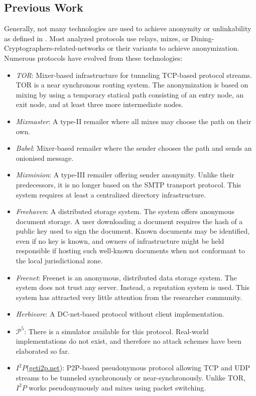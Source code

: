 \documentclass[runningheads]{llncs}
\begin{document}
\subsection{Previous Work}
Generally, not many technologies are used to achieve anonymity or unlinkability as defined in \cite{anon_terminology}. Most analyzed protocols use relays\cite{CHAUM1}, mixes\cite{CHAUM1}, or Dining-Cryptographers-related-networks\cite{chaum-dc} or their variants to achieve anonymization. Numerous protocols have evolved from these technologies:
\begin{itemize}
	\item \emph{TOR}\cite{tor-design}: Mixer-based infrastructure for tunneling TCP-based protocol streams. TOR is a near synchronous routing system. The anonymization is based on mixing by using a temporary statical path consisting of an entry node, an exit node, and at least three more intermediate nodes.
	\item \emph{Mixmaster}\cite{mixmaster-spec}: A type-II remailer where all mixes may choose the path on their own.
	\item \emph{Babel}\cite{babel}: Mixer-based remailer where the sender chooses the path and sends an onionised message.
	\item \emph{Mixminion}\cite{minion-design}: A type-III remailer offering sender anonymity. Unlike their predecessors, it is no longer based on the SMTP transport protocol. This system requires at least a centralized directory infrastructure.
	\item \emph{Freehaven}\cite{freehaven-berk}: A distributed storage system. The system offers anonymous document storage. A user downloading a document requires the hash of a public key used to sign the document. Known documents may be identified, even if no key is known, and owners of infrastructure might be held responsible if hosting such well-known documents when not conformant to the local jurisdictional zone.
	\item \emph{Freenet}\cite{freenet}: Freenet is an anonymous, distributed data storage system. The system does not trust any server. Instead, a reputation system is used. This system has attracted very little attention from the researcher community.
	\item \emph{Herbivore}\cite{herbivore:tr}: A DC-net-based protocol without client implementation.
	\item \emph{$\mathcal{P}^5$}\cite{sherwood2005p5}: There is a simulator available for this protocol. Real-world implementations do not exist, and therefore no attack schemes have been elaborated so far.
	\item \emph{$I^2P$}(\href{https://geti2p.net/}{geti2p.net}): P2P-based pseudonymous protocol allowing TCP and UDP streams to be tunneled synchronously or near-synchronously. Unlike TOR, $I^2P$ works pseudonymously and mixes using packet switching. 
\end{itemize}
\end{document}
